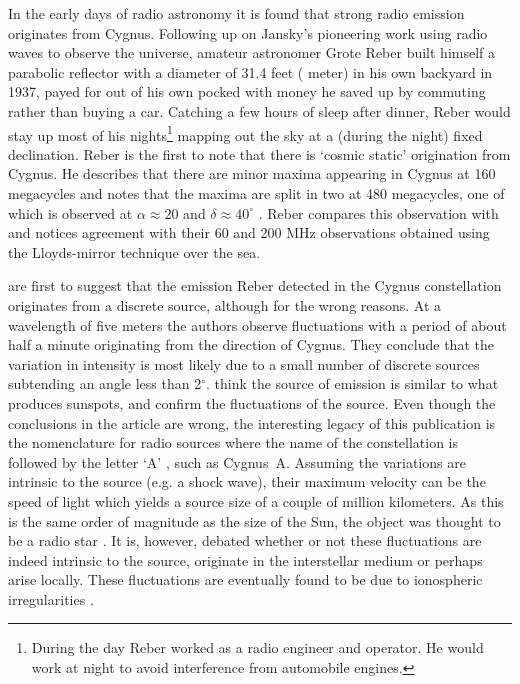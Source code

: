 \documentclass[MScProj_TLRH_ClusterEnergy.tex]{subfiles}
\begin{document}
In the early days of radio astronomy it is found that strong radio emission originates from Cygnus. Following up on Jansky's pioneering work using radio waves to observe the universe, amateur astronomer Grote Reber built himself a parabolic reflector with a diameter of 31.4 feet ( meter) in his own backyard in 1937, payed for out of his own pocked with money he saved up by commuting rather than buying a car. Catching a few hours of sleep after dinner, Reber would stay up most of his nights\footnote{During the day Reber worked as a radio engineer and operator. He would work at night to avoid interference from automobile engines.} mapping out the sky at a (during the night) fixed declination. Reber is the first to note that there is `cosmic static' origination from Cygnus. He describes that there are minor maxima appearing in Cygnus at 160 megacycles \citep{1944ApJ...100..279R} and notes that the maxima are split in two at 480 megacycles, one of which is observed at $\alpha \approx 20$ and $\delta \approx 40^\circ$ \citep{reber1948cosmic}. Reber compares this observation with \citet{1948Natur.161..312B} and notices agreement with their 60 and 200 MHz observations obtained using the Lloyds-mirror technique over the sea.

\citet{1946Natur.158..234H} are first to suggest that the emission Reber detected in the Cygnus constellation originates from a discrete source, although for the wrong reasons. At a wavelength of five meters the authors observe fluctuations with a period of about half a minute originating from the direction of Cygnus. They conclude that the variation in intensity is most likely due to a small number of discrete sources subtending an angle less than 2$^\circ$. \citet{1948Natur.161..312B} think the source of emission is similar to what produces sunspots, and confirm the fluctuations of the source. Even though the conclusions in the article are wrong, the interesting legacy of this publication is the nomenclature for radio sources where the name of the constellation is followed by the letter `A' \citep{1982cra..book.....S}, such as Cygnus~A. Assuming the variations are intrinsic to the source (e.g. a shock wave), their maximum velocity can be the speed of light which yields a source size of a couple of million kilometers. As this is the same order of magnitude as the size of the Sun, the object was thought to be a radio star \citep{1949PPSA...62..491R}. It is, however, debated whether or not these fluctuations are indeed intrinsic to the source, originate in the interstellar medium or perhaps arise locally. These fluctuations are eventually found to be due to ionospheric irregularities \citep{1950AuSRA...3..234S, 1950Natur.165..422S, 1950Natur.165..423L}.
\end{document}
